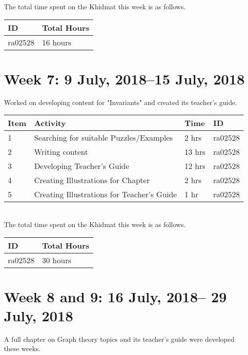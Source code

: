 \documentclass{article}
\begin{document}
The total time spent on the Khidmat this week is as follows.

\begin{tabular}{|l|l|}
  \hline
  ID & Total Hours\\\hline\hline
  ra02528 & 16 hours\\\hline
\end{tabular}

\newpage %

\section*{Week 7: 9 July, 2018--15 July, 2018}
Worked on developing content for "Invariants" and created its teacher's guide.\\


\begin{tabular}{|l|l|l|l|}
  \hline
  Item 	& Activity & Time & ID \\\hline\hline
  1	& Searching for suitable Puzzles/Examples & 2 hrs & ra02528 \\\hline
  2	& Writing content & 13 hrs & ra02528 \\\hline
  3	& Developing Teacher's Guide & 12 hrs & ra02528 \\\hline
  4	& Creating Illustrations for Chapter &  2 hrs & ra02528 \\\hline
  5	& Creating Illustrations for Teacher's Guide & 1 hr & ra02528 \\\hline
\end{tabular}\\

The total time spent on the Khidmat this week is as follows.

\begin{tabular}{|l|l|}
  \hline
  ID & Total Hours\\\hline\hline
  ra02528 & 30 hours\\\hline
\end{tabular}


\newpage %

\section*{Week 8 and 9: 16 July, 2018-- 29 July, 2018}
A full chapter on Graph theory topics and its teacher's guide were developed these weeks.\\
\end{document}
